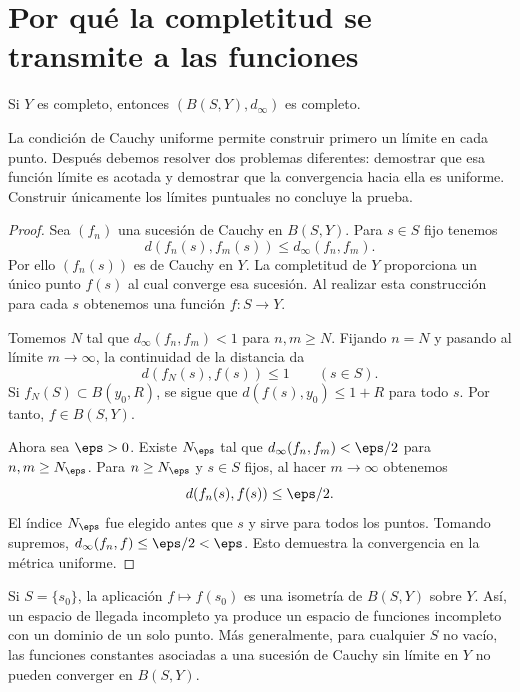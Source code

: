 \section{Por qué la completitud se transmite a las funciones}
\begin{teorema}\label{ch25:completitud}
Si $Y$ es completo, entonces $(B(S,Y),d_\infty)$ es completo.
\end{teorema}
\begin{estrategia}
La condición de Cauchy uniforme permite construir primero un límite en cada punto. Después debemos resolver dos problemas diferentes: demostrar que esa función límite es acotada y demostrar que la convergencia hacia ella es uniforme. Construir únicamente los límites puntuales no concluye la prueba.
\end{estrategia}
\begin{proof}
Sea $(f_n)$ una sucesión de Cauchy en $B(S,Y)$. Para $s\in S$ fijo tenemos
\[
 d(f_n(s),f_m(s))\le d_\infty(f_n,f_m).
\]
Por ello $(f_n(s))$ es de Cauchy en $Y$. La completitud de $Y$ proporciona un único punto $f(s)$ al cual converge esa sucesión. Al realizar esta construcción para cada $s$ obtenemos una función $f:S\to Y$.

Tomemos $N$ tal que $d_\infty(f_n,f_m)<1$ para $n,m\ge N$. Fijando $n=N$ y pasando al límite $m\to\infty$, la continuidad de la distancia da
\[
 d(f_N(s),f(s))\le 1 \qquad(s\in S).
\]
Si $f_N(S)\subset B(y_0,R)$, se sigue que $d(f(s),y_0)\le 1+R$ para todo $s$. Por tanto, $f\in B(S,Y)$.

Ahora sea $\eps>0$. Existe $N_\eps$ tal que $d_\infty(f_n,f_m)<\eps/2$ para $n,m\ge N_\eps$. Para $n\ge N_\eps$ y $s\in S$ fijos, al hacer $m\to\infty$ obtenemos
\[
 d(f_n(s),f(s))\le\eps/2.
\]
El índice $N_\eps$ fue elegido antes que $s$ y sirve para todos los puntos. Tomando supremos, $d_\infty(f_n,f)\le\eps/2<\eps$. Esto demuestra la convergencia en la métrica uniforme.
\end{proof}

\begin{ejemplo}
Si $S=\{s_0\}$, la aplicación $f\mapsto f(s_0)$ es una isometría de $B(S,Y)$ sobre $Y$. Así, un espacio de llegada incompleto ya produce un espacio de funciones incompleto con un dominio de un solo punto. Más generalmente, para cualquier $S$ no vacío, las funciones constantes asociadas a una sucesión de Cauchy sin límite en $Y$ no pueden converger en $B(S,Y)$.
\end{ejemplo}

